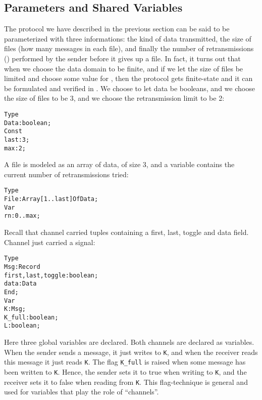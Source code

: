 \subsection{Parameters and Shared Variables}

The protocol we have described in the previous  section can be said to
be  parameterized   with  three   informations:   the  kind  of   data
transmitted, the size of files (how many messages in each file), and
finally the  number of retransmissions ()  performed  by the
sender  before it gives up a file. In fact, it turns out that when we
choose the  data domain to be finite, and if we let the size of files
be limited and choose some value for  ,  then the protocol
gets finite-state and it can be formulated and verified in \Murphi. We
choose to let data be booleans, and we choose the size of files to be
3, and we choose the retransmission limit to be 2:

\begin{alltt}
  Type
    Data : boolean;
  Const 
    last : 3;
    max  : 2;
\end{alltt}

A file is modeled as an array of data, of size 3, and a variable
contains the current number of retransmissions tried:

\begin{alltt}
  Type
    File : Array [1..last] Of Data;
  Var
    rn : 0..max;
\end{alltt}

Recall that channel  carried tuples containing a first, last, toggle
and data field. Channel  just carried a signal:

\begin{alltt}
  Type
    Msg  : Record 
             first, last, toggle : boolean;
             data : Data 
           End;
  Var
    K : Msg;
    K_full : boolean;
    L : boolean;
\end{alltt}

Here three global variables are declared. Both channels  are  declared
as  variables. When the sender sends  a message, it  just  writes  to
{\tt K}, and when  the  receiver reads  this  message  it just  reads
{\tt K}. The flag {\tt K\_full} is raised when some message has been
written to {\tt K}.  Hence, the sender sets it  to  true when writing
to  {\tt K}, and the receiver  sets it to  false  when  reading  from
{\tt K}. This flag-technique is general and used for variables that
play the role of ``channels''.


